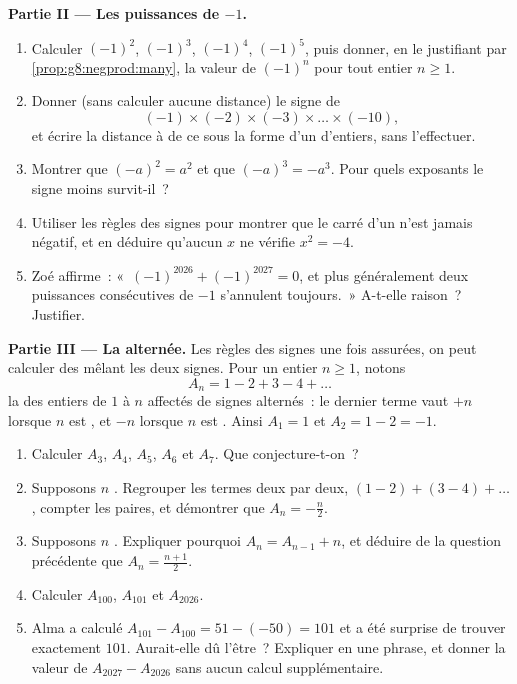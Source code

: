 \begin{problem}
\medskip
\noindent\textbf{Partie II --- Les puissances de $-1$.}
\begin{enumerate}[resume]
  \item Calculer $(-1)^2$, $(-1)^3$, $(-1)^4$, $(-1)^5$, puis donner,
        en le justifiant par \cref{prop:g8:negprod:many}, la valeur
        de $(-1)^n$ pour tout entier $n \geq 1$.
  \item Donner (sans calculer aucune distance) le signe de
        \[
        (-1) \times (-2) \times (-3) \times \dots \times (-10),
        \]
        et écrire la distance à  de ce  sous la forme d'un
         d'entiers, sans l'effectuer.
  \item Montrer que $(-a)^2 = a^2$ et que $(-a)^3 = -a^3$. Pour
        quels exposants le signe moins survit-il~?
  \item Utiliser les règles des signes pour montrer que le carré
        d'un  n'est jamais négatif, et en déduire
        qu'aucun  $x$ ne vérifie $x^2 = -4$.
  \item Zoé affirme~: «~$(-1)^{2026} + (-1)^{2027} = 0$, et plus
        généralement deux puissances consécutives de $-1$ s'annulent
        toujours.~» A-t-elle raison~? Justifier.
\end{enumerate}

\medskip
\noindent\textbf{Partie III --- La  alternée.}
Les règles des signes une fois assurées, on peut calculer des 
mêlant les deux signes. Pour un entier $n \geq 1$, notons
\[
A_n = 1 - 2 + 3 - 4 + \dots
\]
la  des entiers de $1$ à $n$ affectés de signes alternés~: le
dernier terme vaut $+n$ lorsque $n$ est , et $-n$ lorsque $n$
est . Ainsi $A_1 = 1$ et $A_2 = 1 - 2 = -1$.
\begin{enumerate}[resume]
  \item Calculer $A_3$, $A_4$, $A_5$, $A_6$ et $A_7$. Que
        conjecture-t-on~?
  \item Supposons $n$ . Regrouper les termes deux par deux,
        $(1 - 2) + (3 - 4) + \dots$, compter les paires, et démontrer
        que $A_n = -\frac{n}{2}$.
  \item Supposons $n$ . Expliquer pourquoi
        $A_n = A_{n-1} + n$, et déduire de la question précédente que
        $A_n = \frac{n + 1}{2}$.
  \item Calculer $A_{100}$, $A_{101}$ et $A_{2026}$.
  \item Alma a calculé $A_{101} - A_{100} = 51 - (-50) = 101$ et a
        été surprise de trouver exactement $101$. Aurait-elle dû
        l'être~? Expliquer en une phrase, et donner la valeur de
        $A_{2027} - A_{2026}$ sans aucun calcul supplémentaire.
\end{enumerate}
\end{problem}

